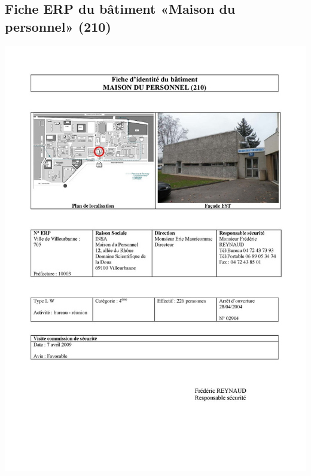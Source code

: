 \documentclass[hidelinks, paper=a4, fontsize=13pt]{report}
\begin{document}
\subsection{Fiche ERP du bâtiment «Maison du personnel» (210)}
\begin{center}
\includegraphics[scale=0.5]{Annexes/Documents/ERPMaisonDuPerso}
\end{center}
\end{document}
